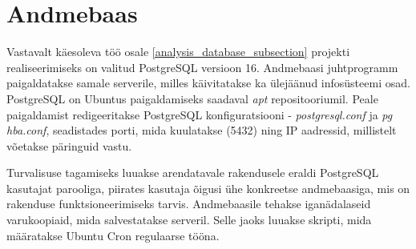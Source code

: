 \section{Andmebaas}
Vastavalt käesoleva töö osale \ref{analysis_database_subsection} projekti realiseerimiseks
on valitud PostgreSQL versioon 16. Andmebaasi juhtprogramm paigaldatakse samale serverile, milles 
käivitatakse ka ülejäänud infosüsteemi osad. PostgreSQL on Ubuntus paigaldamiseks saadaval
\textit{apt} repositooriumil. Peale paigaldamist redigeeritakse PostgreSQL konfiguratsiooni - 
\textit{postgresql.conf} ja \textit{pg hba.conf}, seadistades porti, mida kuulatakse (5432) ning 
IP aadressid, millistelt võetakse päringuid vastu.

Turvalisuse tagamiseks luuakse arendatavale rakendusele eraldi PostgreSQL kasutajat parooliga, 
piirates kasutaja õigusi ühe konkreetse andmebaasiga, mis on rakenduse funktsioneerimiseks tarvis.
Andmebaasile tehakse iganädalaseid varukoopiaid, mida salvestatakse serveril. Selle jaoks luuakse skripti,
mida määratakse Ubuntu Cron regulaarse tööna.



